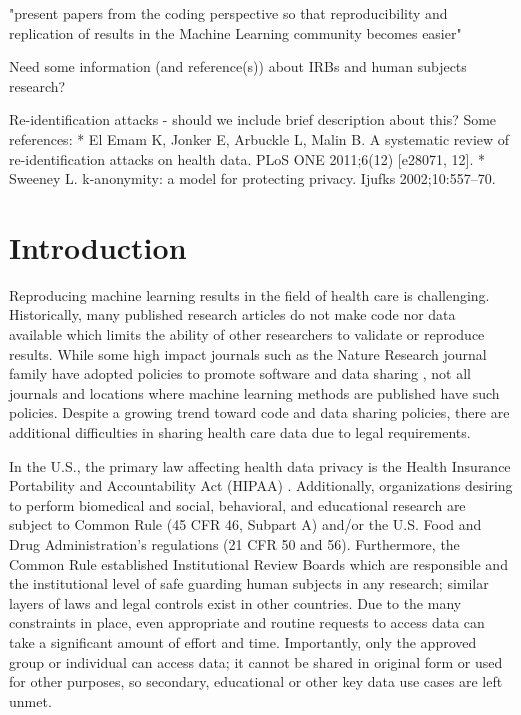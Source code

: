 "present papers from the coding perspective so that reproducibility and replication of results in the Machine Learning community becomes easier"


Need some information (and reference(s)) about IRBs and human subjects research?

Re-identification attacks - should we include brief description about this? Some references: 
* El Emam K, Jonker E, Arbuckle L, Malin B. A systematic review of re-identification attacks on health data. PLoS ONE 2011;6(12) [e28071, 12].
* Sweeney L. k-anonymity: a model for protecting privacy. Ijufks 2002;10:557–70.

\section{Introduction}

Reproducing machine learning results in the field of health care is challenging. Historically, many published research articles do not make code nor data available which limits the ability of other researchers to validate or reproduce results. While some high impact journals such as the Nature Research journal family have adopted policies to promote software and data sharing \cite{natmethods}, not all journals and locations where machine learning methods are published have such policies. Despite a growing trend toward code and data sharing policies, there are additional difficulties in sharing health care data due to legal requirements. 

 In the U.S., the primary law affecting health data privacy is the Health Insurance Portability and Accountability Act (HIPAA) \cite{hippapro}. Additionally, organizations desiring to perform biomedical and social, behavioral, and educational research are subject to Common Rule (45 CFR 46, Subpart A) and/or the U.S. Food and Drug Administration’s regulations (21 CFR 50 and 56). Furthermore, the Common Rule established Institutional Review Boards which are responsible and the institutional level of safe guarding human subjects in any research; similar layers of laws and legal controls exist in other countries. Due to the many constraints in place, even appropriate and routine requests to access data can take a significant amount of effort and time. Importantly, only the approved group or individual can access data; it cannot be shared in original form or used for other purposes, so secondary, educational or other key data use cases are left unmet.
 
